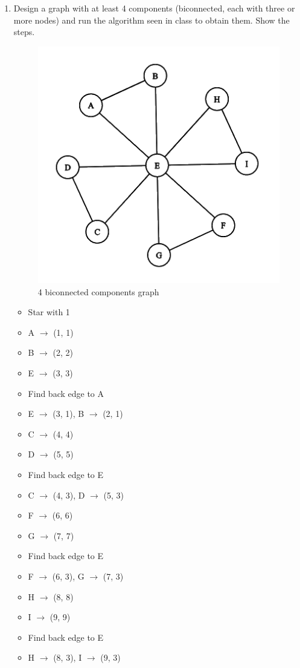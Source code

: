 \documentclass{article}
\begin{document}
\begin{enumerate}
    \item Design a graph with at least 4 components (biconnected, each with three or more nodes) and run the algorithm seen in class to obtain them. Show the steps.
    \begin{figure}[ht]
        \centering
        \includegraphics{Hw8/G1.png}
        \caption{4 biconnected components graph}
        \label{graph4}
    \end{figure}

    \begin{itemize}
        \item Star with 1
        \item A $\rightarrow$ (1, 1)
        \item B $\rightarrow$ (2, 2)
        \item E $\rightarrow$ (3, 3)
        \item Find back edge to A
        \item E $\rightarrow$ (3, 1), B $\rightarrow$ (2, 1)
        \item C $\rightarrow$ (4, 4)
        \item D $\rightarrow$ (5, 5)
        \item Find back edge to E
        \item C $\rightarrow$ (4, 3), D $\rightarrow$ (5, 3)
        \item F $\rightarrow$ (6, 6)
        \item G $\rightarrow$ (7, 7)
        \item Find back edge to E
        \item F $\rightarrow$ (6, 3), G $\rightarrow$ (7, 3)
        \item H $\rightarrow$ (8, 8)
        \item I $\rightarrow$ (9, 9)
        \item Find back edge to E
        \item H $\rightarrow$ (8, 3), I $\rightarrow$ (9, 3)
    \end{itemize}


\end{enumerate}
\end{document}
